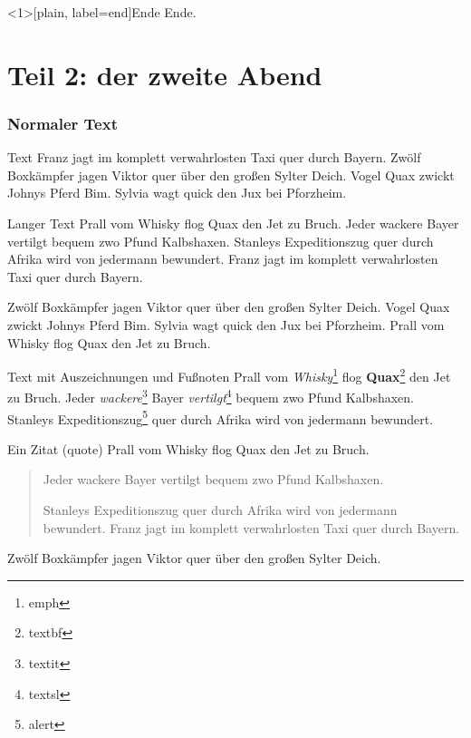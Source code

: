 \documentclass[t, aspectratio=169, handout, ngerman]{beamer}
\begin{document}
	\begin{frame}[plain, label=end]{Ende}
		\Huge{Ende.}
	\end{frame}








	\part{Teil 2: der zweite Abend}

	\frame{\partpage}

	\section{Normaler Text}

	\begin{frame}{Text}
		Franz jagt im komplett verwahrlosten Taxi quer durch Bayern.
		Zwölf Boxkämpfer jagen Viktor quer über den großen Sylter Deich.
		Vogel Quax zwickt Johnys Pferd Bim.
		Sylvia wagt quick den Jux bei Pforzheim.
	\end{frame}

	\begin{frame}{Langer Text}
		Prall vom Whisky flog Quax den Jet zu Bruch.
		Jeder wackere Bayer vertilgt bequem zwo Pfund Kalbshaxen.
		Stanleys Expeditionszug quer durch Afrika wird von jedermann bewundert.
		Franz jagt im komplett verwahrlosten Taxi quer durch Bayern.

		Zwölf Boxkämpfer jagen Viktor quer über den großen Sylter Deich.
		Vogel Quax zwickt Johnys Pferd Bim.
		Sylvia wagt quick den Jux bei Pforzheim.
		Prall vom Whisky flog Quax den Jet zu Bruch.
	\end{frame}

	\begin{frame}{Text mit Auszeichnungen und Fußnoten}
		Prall vom \emph{Whisky}\footnote{emph} flog \textbf{Quax}\footnote{textbf} den Jet zu Bruch.
		Jeder \textit{wackere}\footnote{textit} Bayer \textsl{vertilgt}\footnote{textsl} bequem zwo Pfund Kalbshaxen.
		Stanleys \alert{Expeditionszug}\footnote{alert} quer durch Afrika wird von jedermann bewundert.
	\end{frame}

	\begin{frame}{Ein Zitat (quote)}
		Prall vom Whisky flog Quax den Jet zu Bruch.

		\begin{quote}
			Jeder wackere Bayer vertilgt bequem zwo Pfund Kalbshaxen.

			Stanleys Expeditionszug quer durch Afrika wird von jedermann bewundert.
			Franz jagt im komplett verwahrlosten Taxi quer durch Bayern.
		\end{quote}

		Zwölf Boxkämpfer jagen Viktor quer über den großen Sylter Deich.
	\end{frame}
\end{document}
